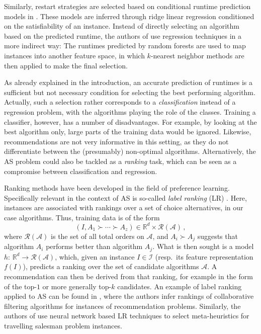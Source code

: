 \documentclass[runningheads]{llncs}
\begin{document}
Similarly, restart strategies are selected based on conditional runtime prediction models in \cite{haim2009restart}. These models are inferred through ridge linear regression conditioned on the satisfiability of an instance. Instead of directly selecting an algorithm based on the predicted runtime, the authors of \cite{collauttiMMO13} use regression techniques in a more indirect way: The runtimes predicted by random forests are used to map instances into another feature space, in which $k$-nearest neighbor methods are then applied to make the final selection. 


As already explained in the introduction, an accurate prediction of runtimes is a sufficient but not necessary condition for selecting the best performing algorithm. Actually, such a selection rather corresponds to a \emph{classification} instead of a regression problem, with the algorithms playing the role of the classes. Training a classifier, however, has a number of disadvantages. For example, by looking at the best algorithm only, large parts of the training data would be ignored. Likewise, recommendations are not very informative in this setting, as they do not differentiate between the (presumably) non-optimal algorithms. Alternatively, the AS problem could also be tackled as a \emph{ranking} task, which can be seen as a compromise between classification and regression.

Ranking methods have been developed in the field of preference learning. Specifically relevant in the context of AS is so-called \textit{label ranking} (LR) \cite{vembu_label_2010}. Here, instances are associated with rankings over a set of choice alternatives, in our case algorithms.  
Thus, training data is of the form 
\begin{equation}
    \left(I, A_1 \succ \cdots \succ A_z \right) \in \mathbb{R}^d \times \mathcal{R}(\mathcal{A}) \, ,
\end{equation}
where $\mathcal{R}(\mathcal{A})$ is the set of all total orders on $\mathcal{A}$, and $A_i \succ A_j$ suggests that algorithm $A_i$ performs better than algorithm $A_j$. What is then sought is a model $h: \, \mathbb{R}^d \rightarrow \mathcal{R}(\mathcal{A})$, which, given an instance $I \in \mathcal{I}$ (resp.\ its feature representation $f(I)$), predicts a ranking over the set of candidate algorithms $\mathcal{A}$. A recommendation can then be derived from that ranking, for example in the form of the top-$1$ or more generally top-$k$ candidates. 
An example of label ranking applied to AS can be found in \cite{cunha2018label}, where the authors infer rankings of collaborative filtering algorithms for instances of recommendation problems. 
Similarly, the authors of \cite{kanda2012meta} use neural network based LR techniques to select meta-heuristics for travelling salesman problem instances.
\end{document}
